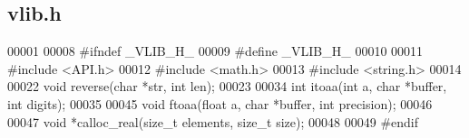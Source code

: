 \subsection{vlib.\+h}
\label{vlib_8h_source}

\begin{DoxyCode}
00001 
00008 \textcolor{preprocessor}{#ifndef \_VLIB\_H\_}
00009 \textcolor{preprocessor}{#define \_VLIB\_H\_}
00010 
00011 \textcolor{preprocessor}{#include <API.h>}
00012 \textcolor{preprocessor}{#include <math.h>}
00013 \textcolor{preprocessor}{#include <string.h>}
00014 
00022 \textcolor{keywordtype}{void} reverse(\textcolor{keywordtype}{char} *str, \textcolor{keywordtype}{int} len);
00023 
00034 \textcolor{keywordtype}{int} itoaa(\textcolor{keywordtype}{int} a, \textcolor{keywordtype}{char} *buffer, \textcolor{keywordtype}{int} digits);
00035 
00045 \textcolor{keywordtype}{void} ftoaa(\textcolor{keywordtype}{float} a, \textcolor{keywordtype}{char} *buffer, \textcolor{keywordtype}{int} precision);
00046 
00047 \textcolor{keywordtype}{void} *calloc_real(\textcolor{keywordtype}{size\_t} elements, \textcolor{keywordtype}{size\_t} size);
00048 
00049 \textcolor{preprocessor}{#endif}
\end{DoxyCode}
